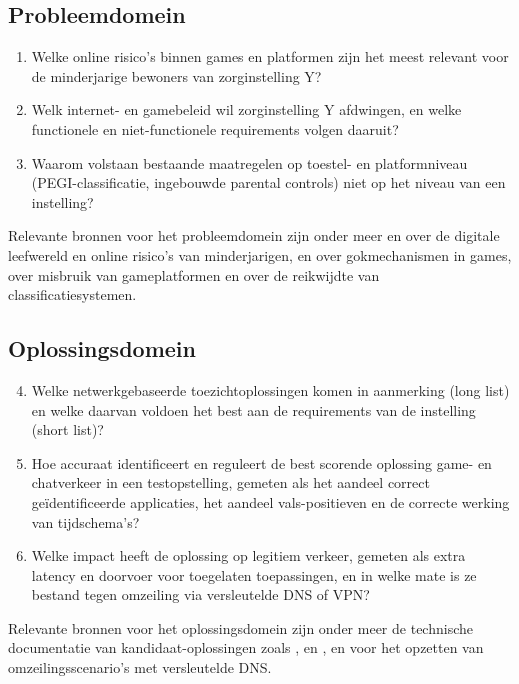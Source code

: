 \documentclass{hogent-article}
\begin{document}
\subsection{Probleemdomein}
\begin{enumerate}
    \item Welke online risico's binnen games en platformen zijn het meest relevant voor de minderjarige bewoners van zorginstelling Y?
    \item Welk internet- en gamebeleid wil zorginstelling Y afdwingen, en welke functionele en niet-functionele requirements volgen daaruit?
    \item Waarom volstaan bestaande maatregelen op toestel- en platformniveau (PEGI-classificatie, ingebouwde parental controls) niet op het niveau van een instelling?
\end{enumerate}
Relevante bronnen voor het probleemdomein zijn onder meer \textcite{Smahel2020} en \textcite{Mediawijs2024} over de digitale leefwereld en online risico's van minderjarigen, \textcite{ZendleCairns2018} en \textcite{Kansspelcommissie2018} over gokmechanismen in games, \textcite{CarvilleChen2024} over misbruik van gameplatformen en \textcite{PEGI2026} over de reikwijdte van classificatiesystemen.

\subsection{Oplossingsdomein}
\begin{enumerate}
    \setcounter{enumi}{3}
    \item Welke netwerkgebaseerde toezichtoplossingen komen in aanmerking (long list) en welke daarvan voldoen het best aan de requirements van de instelling (short list)?
    \item Hoe accuraat identificeert en reguleert de best scorende oplossing game- en chatverkeer in een testopstelling, gemeten als het aandeel correct geïdentificeerde applicaties, het aandeel vals-positieven en de correcte werking van tijdschema's?
    \item Welke impact heeft de oplossing op legitiem verkeer, gemeten als extra latency en doorvoer voor toegelaten toepassingen, en in welke mate is ze bestand tegen omzeiling via versleutelde DNS of VPN?
\end{enumerate}
Relevante bronnen voor het oplossingsdomein zijn onder meer de technische documentatie van kandidaat-oplossingen zoals \textcite{OPNsense2026}, \textcite{Netgate2026} en \textcite{PiHole2026}, en \textcite{Hoffman2018} voor het opzetten van omzeilingsscenario's met versleutelde DNS.
\end{document}
